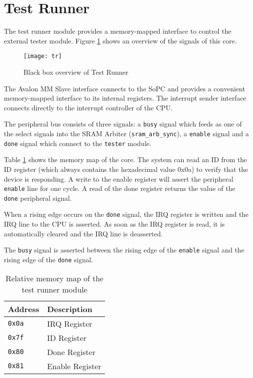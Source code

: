 \newpage
\section{Test Runner}
The test runner module provides a memory-mapped interface to control the external
tester module. Figure \ref{figure:tr_blackbox} shows an overview of the signals of this core.
\begin{figure}[h!]
\begin{center}
\texttt{[image: tr]}
\caption{Black box overview of Test Runner}
\label{figure:tr_blackbox}
\end{center}
\end{figure}


The Avalon MM Slave interface connects to the SoPC and provides a convenient
memory-mapped interface to its internal registers. The interrupt sender interface
connects directly to the interrupt controller of the CPU.

The peripheral bus consists of three signals: a \texttt{busy} signal which feeds as
one of the select signals into the SRAM Arbiter (\texttt{sram\_arb\_sync}), a \texttt{enable}
signal and a \texttt{done} signal which connect to the \texttt{tester} module.

Table \ref{table:trunner_memorymap} shows the memory map of the core. The system can read an ID from the
ID register (which always contains the hexadecimal value 0x0a) to verify that
the device is responding. A write to the enable register will assert the peripheral
\texttt{enable} line for one cycle. A read of the done register returns the value
of the \texttt{done} peripheral signal.

When a rising edge occurs on the \texttt{done} signal, the IRQ register is written
and the IRQ line to the CPU is asserted. As soon as the IRQ register is read, it is
automatically cleared and the IRQ line is deasserted.

The \texttt{busy} signal is asserted between the rising edge of the \texttt{enable} signal
and the rising edge of the \texttt{done} signal.


\begin{table}[h!]
\centering
\begin{tabular}{ | l | l | }
 \hline
   Address       & Description \\
 \hline
   \texttt{0x0a} & IRQ Register \\
 \hline
   \texttt{0x7f} & ID Register \\
 \hline
   \texttt{0x80} & Done Register \\
 \hline
   \texttt{0x81} & Enable Register \\
 \hline
\end{tabular}
\caption{Relative memory map of the test runner module}
\label{table:trunner_memorymap}
\end{table}


